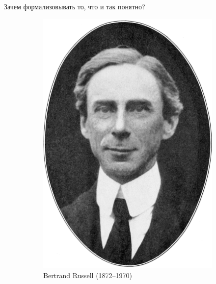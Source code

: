 \begin{frame}{Зачем формализовывать то, что и так понятно?}
\begin{figure}[t]
\begin{subfigure}[t]{0.55\textwidth}
  \end{subfigure}
\hspace{0.05\textwidth}
  \begin{subfigure}[t]{0.35\textwidth}
      \begin{minipage}{0.7\textwidth}
  \includegraphics[width=1\textwidth]{800px-Bertrand_Russell_transparent_bg.png}\\
  Bertrand Russell (1872--1970)
\end{minipage}
  \end{subfigure}
\end{figure}
\end{frame}

